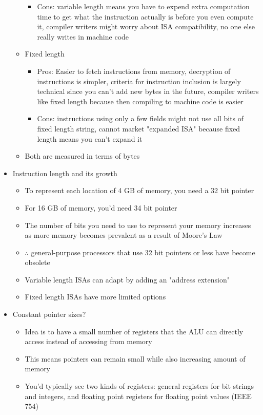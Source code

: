 \documentclass{article}
\begin{document}
\begin{itemize}
\begin{itemize}
\begin{itemize}
					\item Cons: variable length means you have to expend extra computation time to get what the instruction actually is before you even compute it, compiler writers might worry about ISA compatibility, no one else really writes in machine code
				\end{itemize}
			\item Fixed length
				\begin{itemize}
					\item Pros: Easier to fetch instructions from memory, decryption of instructions is simpler, criteria for instruction inclusion is largely technical since you can't add new bytes in the future, compiler writers like fixed length because then compiling to machine code is easier
					\item Cons: instructions using only a few fields might not use all bits of fixed length string, cannot market "expanded ISA" because fixed length means you can't expand it
				\end{itemize}
			\item Both are measured in terms of bytes
		\end{itemize}
	\item Instruction length and its growth
		\begin{itemize}
			\item To represent each location of 4 GB of memory, you need a 32 bit pointer
			\item For 16 GB of memory, you'd need 34 bit pointer
			\item The number of bits you need to use to represent your memory increases as more memory becomes prevalent as a result of Moore's Law
			\item $\therefore$ general-purpose processors that use 32 bit pointers or less have become obsolete
			\item Variable length ISAs can adapt by adding an "address extension"
			\item Fixed length ISAs have more limited options
		\end{itemize}
	\item Constant pointer sizes?
		\begin{itemize}
			\item Idea is to have a small number of registers that the ALU can directly access instead of accessing from memory
			\item This means pointers can remain small while also increasing amount of memory
			\item You'd typically see two kinds of registers: general registers for bit strings and integers, and floating point registers for floating point values (IEEE 754)

\end{itemize}
\end{itemize}
\end{document}

